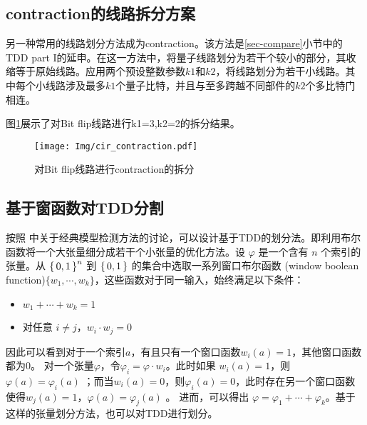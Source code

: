 \subsection*{contraction的线路拆分方案}
另一种常用的线路划分方法成为contraction。该方法是\ref{sec-compare}小节中的TDD part I的延申。在这一方法中，将量子线路划分为若干个较小的部分，其收缩等于原始线路。应用两个预设整数参数$k1$和$k2$，将线路划分为若干小线路。其中每个小线路涉及最多$k1$个量子比特，并且与至多跨越不同部件的$k2$个多比特门相连。
\begin{example}
    图\ref{fig:contraction}展示了对Bit flip线路进行k1=3,k2=2的拆分结果。
\begin{figure}[!htbp]
	\centering
	\texttt{[image: Img/cir\_contraction.pdf]}
	\caption{对Bit flip线路进行contraction的拆分}
	\label{fig:contraction}
\end{figure} 
\end{example}



\subsection*{基于窗函数对TDD分割}
按照 \citep{narayan1996partitioned} 中关于经典模型检测方法的讨论，可以设计基于TDD的划分法。即利用布尔函数将一个大张量细分成若干个小张量的优化方法。设 $\varphi$ 是一个含有 $n$ 个索引的张量。从 $\set{0,1}^n$ 到 $\set{0,1}$ 的集合中选取一系列窗口布尔函数 (window boolean function)$\{w_1,\cdots, w_k\}$，这些函数对于同一输入，始终满足以下条件： 
\begin{itemize}
    \item $w_1+\cdots +w_k=1$
    \item 对任意 $i \neq j$，$w_i \cdot w_j = 0$
\end{itemize} 
因此可以看到对于一个索引$a$，有且只有一个窗口函数$w_i (a) = 1$，其他窗口函数都为$0$。
对一个张量$\varphi$，令$\varphi_i=\varphi \cdot w_i$。此时如果 $w_i(a)=1$，则$\varphi(a)=\varphi_i(a)$ ；而当$w_i(a)=0$，则$\varphi_i(a)=0$，此时存在另一个窗口函数使得$w_j(a)=1$，$\varphi(a)=\varphi_j(a)$ 。
进而，可以得出 $\varphi = \varphi_1+ \cdots +\varphi_k$。基于这样的张量划分方法，也可以对TDD进行划分。

